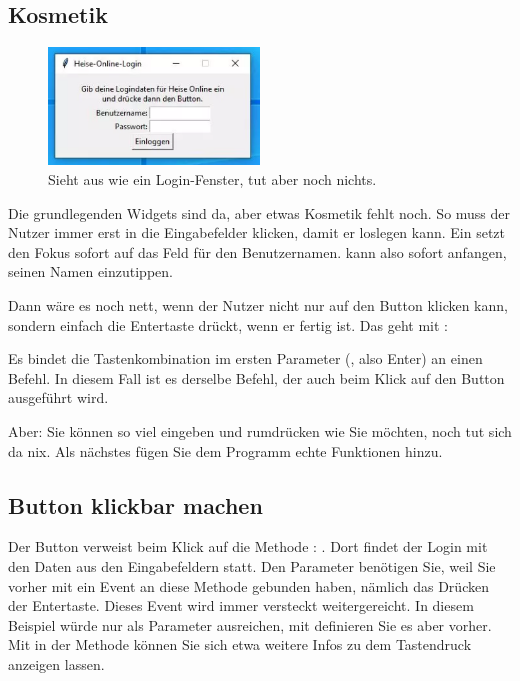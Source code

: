 
\subsection{Kosmetik}

\begin{figure}
    \includegraphics[width=0.5\textwidth]{Images/TKinter/TkinterLogin}
    \caption{Sieht aus wie ein Login-Fenster, tut aber noch nichts.} \label{TkinterLogin}
\end{figure}


Die grundlegenden Widgets sind da, aber etwas Kosmetik fehlt noch. So muss der Nutzer immer erst in die Eingabefelder klicken, damit er loslegen kann. Ein  setzt den Fokus sofort auf das Feld für den Benutzernamen.  kann also sofort anfangen, seinen Namen einzutippen.

Dann wäre es noch nett, wenn der Nutzer nicht nur auf den Button klicken kann, sondern einfach die Entertaste drückt, wenn er fertig ist. Das geht mit :

\medskip


\medskip

Es bindet die Tastenkombination im ersten Parameter (, also Enter) an einen Befehl. In diesem Fall ist es derselbe Befehl, der auch beim Klick auf den Button ausgeführt wird.

Aber: Sie können so viel eingeben und rumdrücken wie Sie möchten, noch tut sich da nix. Als nächstes fügen Sie dem Programm echte Funktionen hinzu.

\subsection{Button klickbar machen}

Der Button verweist beim Klick auf die Methode : . Dort findet der Login mit den Daten aus den Eingabefeldern statt. Den Parameter  benötigen Sie, weil Sie vorher mit  ein Event an diese Methode gebunden haben, nämlich das Drücken der Entertaste. Dieses Event wird immer versteckt weitergereicht. In diesem Beispiel würde nur  als Parameter ausreichen, mit  definieren Sie es aber vorher. Mit  in der Methode können Sie sich etwa weitere Infos zu dem Tastendruck anzeigen lassen.

